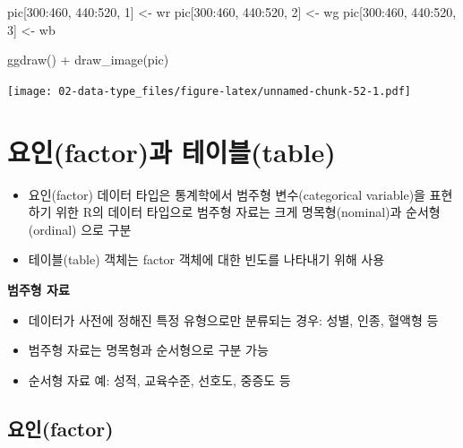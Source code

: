 \documentclass[
  11pt,
]{krantz}
\newenvironment{Shaded}{\begin{snugshade}}{\end{snugshade}}
\newcommand{\DecValTok}[1]{\textcolor[rgb]{0.06,0.06,0.06}{#1}}
\newcommand{\FunctionTok}[1]{\textcolor[rgb]{0,0,0}{#1}}
\newcommand{\NormalTok}[1]{#1}
\newcommand{\OtherTok}[1]{\textcolor[rgb]{0.37,0.37,0.37}{#1}}
\newcommand{\SpecialCharTok}[1]{\textcolor[rgb]{0,0,0}{#1}}
\providecommand{\tightlist}{%
  \setlength{\itemsep}{0pt}\setlength{\parskip}{0pt}}
\begin{document}
\begin{Shaded}
\begin{Highlighting}[]
\NormalTok{pic[}\DecValTok{300}\SpecialCharTok{:}\DecValTok{460}\NormalTok{, }\DecValTok{440}\SpecialCharTok{:}\DecValTok{520}\NormalTok{, }\DecValTok{1}\NormalTok{] }\OtherTok{\textless{}{-}}\NormalTok{ wr}
\NormalTok{pic[}\DecValTok{300}\SpecialCharTok{:}\DecValTok{460}\NormalTok{, }\DecValTok{440}\SpecialCharTok{:}\DecValTok{520}\NormalTok{, }\DecValTok{2}\NormalTok{] }\OtherTok{\textless{}{-}}\NormalTok{ wg}
\NormalTok{pic[}\DecValTok{300}\SpecialCharTok{:}\DecValTok{460}\NormalTok{, }\DecValTok{440}\SpecialCharTok{:}\DecValTok{520}\NormalTok{, }\DecValTok{3}\NormalTok{] }\OtherTok{\textless{}{-}}\NormalTok{ wb}

\FunctionTok{ggdraw}\NormalTok{() }\SpecialCharTok{+}
  \FunctionTok{draw\_image}\NormalTok{(pic)}
\end{Highlighting}
\end{Shaded}

\texttt{[image: 02-data-type\_files/figure-latex/unnamed-chunk-52-1.pdf]}

\normalsize

\hypertarget{factor-table}{%
\section{요인(factor)과 테이블(table)}\label{factor-table}}

\begin{itemize}
\tightlist
\item
  요인(factor) 데이터 타입은 통계학에서 범주형 변수(categorical variable)을 표현하기 위한 R의 데이터 타입으로 범주형 자료는 크게 명목형(nominal)과 순서형(ordinal) 으로 구분
\item
  테이블(table) 객체는 factor 객체에 대한 빈도를 나타내기 위해 사용
\end{itemize}

\textbf{범주형 자료}

\begin{itemize}
\tightlist
\item
  데이터가 사전에 정해진 특정 유형으로만 분류되는 경우: 성별, 인종, 혈액형 등
\item
  범주형 자료는 명목형과 순서형으로 구분 가능
\item
  순서형 자료 예: 성적, 교육수준, 선호도, 중증도 등
\end{itemize}

\hypertarget{factor}{%
\subsection{요인(factor)}\label{factor}}
\end{document}

